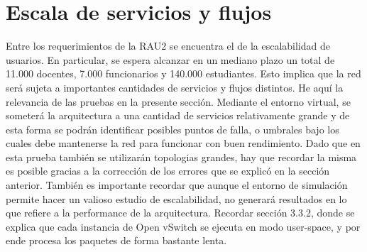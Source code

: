 \section{Escala de servicios y flujos}
Entre los requerimientos de la RAU2 se encuentra el de la escalabilidad de usuarios. En particular, se espera alcanzar en un mediano plazo un total de 11.000 docentes, 7.000 funcionarios y 140.000 estudiantes. Esto implica que la red será sujeta a importantes cantidades de servicios y flujos distintos. He aquí la relevancia de las pruebas en la presente sección. Mediante el entorno virtual, se someterá la arquitectura a una cantidad de servicios relativamente grande y de esta forma se podrán identificar posibles puntos de falla, o umbrales bajo los cuales debe mantenerse la red para funcionar con buen rendimiento. Dado que en esta prueba también se utilizarán topologias grandes, hay que recordar la misma es posible gracias a la corrección de los errores que se explicó en la sección anterior. También es importante recordar que aunque el entorno de simulación permite hacer un valioso estudio de escalabilidad, no generará resultados en lo que refiere a la performance de la arquitectura. Recordar sección 3.3.2, donde se explica que cada instancia de Open vSwitch se ejecuta en modo user-space, y por ende procesa los paquetes de forma bastante lenta.

